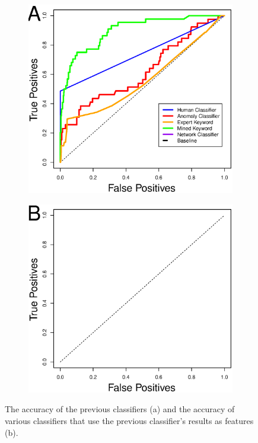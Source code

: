 \documentclass{acm_proc_article-sp}
\begin{document}
\begin{figure} [h]
\centering
\begin{subfigure}[b]{.2\textwidth}
\includegraphics[width=\textwidth]{figs/meta_roc.eps}
\end{subfigure}
\begin{subfigure}[b]{.2\textwidth}
\includegraphics[width=\textwidth]{figs/meta_roc_final.eps}
\end{subfigure}
\caption{The accuracy of the previous classifiers (a) and the accuracy of various classifiers that use the previous classifier's results as features (b). }
\label{fig:roc_meta}
\end{figure}
\end{document}
